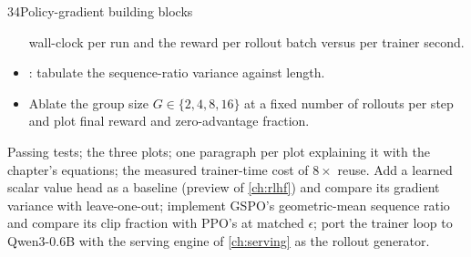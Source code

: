 \begin{labbox}{34}{Policy-gradient building blocks}
\begin{itemize}
  wall-clock per run and the reward per rollout batch versus per trainer second.
\item {}: tabulate the sequence-ratio variance against length.
\item Ablate the group size $G\in\{2,4,8,16\}$ at a fixed number of rollouts per step and plot final
  reward and zero-advantage fraction.
\end{itemize}
Passing tests; the three plots; one paragraph per plot explaining it with the chapter's
equations; the measured trainer-time cost of $8\times$ reuse.
Add a learned scalar value head as a baseline (preview of \cref{ch:rlhf}) and compare its
gradient variance with leave-one-out; implement GSPO's geometric-mean sequence ratio and compare
its clip fraction with PPO's at matched $\epsilon$; port the trainer loop to Qwen3-0.6B with the
serving engine of \cref{ch:serving} as the rollout generator.
\end{labbox}
